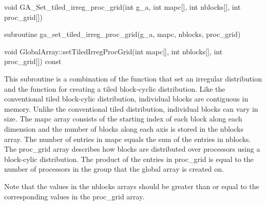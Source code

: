 \documentclass[12pt]{article}
\begin{document}
\begin{capi}
\begin{ccode}
void GA_Set_tiled_irreg_proc_grid(int g_a, int mapc[], int nblocks[], int proc_grid[])
\end{ccode}
\begin{funcargs}
\end{funcargs}
\end{capi}

\begin{fapi}
\begin{fcode}
subroutine ga_set_tiled_irreg_proc_grid(g_a, mapc, nblocks, proc_grid)
\end{fcode}
\begin{funcargs}
\end{funcargs}
\end{fapi}

\begin{cxxapi}
\begin{cxxcode}
void GlobalArray::setTiledIrregProcGrid(int mapc[], int nblocks[], int proc_grid[]) const
\end{cxxcode}
\begin{funcargs}
\end{funcargs}
\end{cxxapi}

\gcoll

\begin{desc}
This subroutine is a combination of the function that set an irregular
distribution and the function for creating a tiled block-cyclic distribution.
Like the conventional tiled block-cylic distribution, individual blocks are
contiguous in memory. Unlike the conventional tiled distribution, individual
blocks can vary in size. The mapc array consists of the starting index of each
block along each dimension and the number of blocks along each axis is stored in
the nblocks array. The number of entries in mapc equals the sum of the entries
in nblocks. The proc_grid array describes how blocks are distributed over
processors using a block-cylic distribution. The product of the entries in
proc_grid is equal to the number of processors in the group that the global
array is created on.

Note that the values in the nblocks arrays should be greater than or equal to
the corresponding values in the proc_grid array.
\end{desc}
\end{document}
